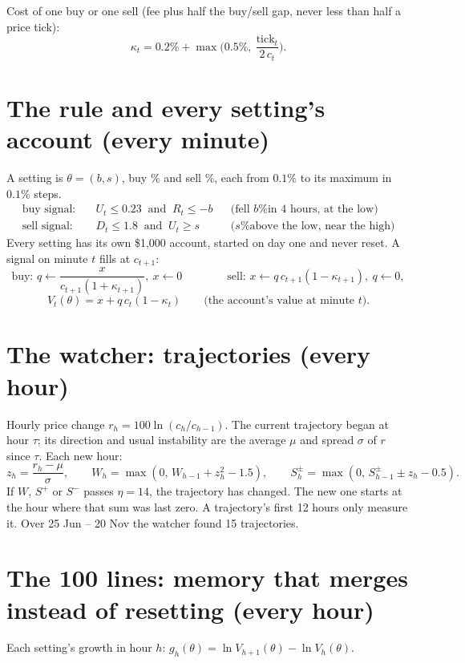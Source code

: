 \documentclass[11pt]{article}
\begin{document}
Cost of one buy or one sell (fee plus half the buy/sell gap, never less than half a price tick):
\[
\kappa_t = 0.2\% + \max\!\Big(0.5\%,\ \frac{\text{tick}_t}{2\,c_t}\Big).
\]

\section{The rule and every setting's account (every minute)}

A setting is $\theta = (b, s)$, buy \% and sell \%, each from $0.1\%$ to its maximum in $0.1\%$ steps.
\begin{align*}
\text{buy signal:}\quad & U_t \le 0.23 \ \text{ and }\ R_t \le -b && \text{(fell $b$\% in 4 hours, at the low)}\\
\text{sell signal:}\quad & D_t \le 1.8 \ \text{ and }\ U_t \ge s && \text{($s$\% above the low, near the high)}
\end{align*}
Every setting has its own \$1{,}000 account, started on day one and never reset. A signal on minute
$t$ fills at $c_{t+1}$:
\[
\text{buy: } q \leftarrow \frac{x}{c_{t+1}(1+\kappa_{t+1})},\ x \leftarrow 0
\qquad\qquad
\text{sell: } x \leftarrow q\,c_{t+1}(1-\kappa_{t+1}),\ q \leftarrow 0,
\]
\[
V_t(\theta) = x + q\,c_t(1-\kappa_t) \qquad \text{(the account's value at minute } t\text{)}.
\]

\section{The watcher: trajectories (every hour)}

Hourly price change $r_h = 100\ln(c_h/c_{h-1})$. The current trajectory began at hour $\tau$; its
direction and usual instability are the average $\mu$ and spread $\sigma$ of $r$ since $\tau$. Each
new hour:
\[
z_h = \frac{r_h-\mu}{\sigma},\qquad
W_h = \max(0,\,W_{h-1} + z_h^2 - 1.5),\qquad
S^{\pm}_h = \max(0,\,S^{\pm}_{h-1} \pm z_h - 0.5).
\]
If $W$, $S^+$ or $S^-$ passes $\eta = 14$, the trajectory has changed. The new one starts at the hour
where that sum was last zero. A trajectory's first 12 hours only measure it. Over 25 Jun -- 20 Nov the
watcher found 15 trajectories.

\section{The 100 lines: memory that merges instead of resetting (every hour)}

Each setting's growth in hour $h$: $g_h(\theta) = \ln V_{h+1}(\theta) - \ln V_h(\theta)$.
\end{document}
